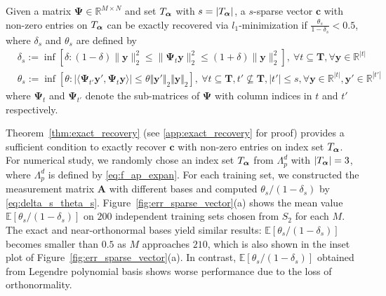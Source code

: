 \begin{thm}
  Given a matrix $\bm{{\Psi}} \in \mathbb{R}^{M\times N}$ and set $T_{\bm\alpha}$ with $s = \vert T_{\bm\alpha} \vert$, a $s$-sparse vector $\bm c$ with non-zero entries on $T_{\bm\alpha}$ can be exactly recovered via $l_1$-minimization if $\frac{\theta_s}{1-\delta_s} < 0.5$, where $\delta_s$ and $\theta_s$ are defined by
  \begin{equation}
    \begin{split}
      &\delta_s := \inf \left[ \delta :  (1-\delta)\|\bm y\|_2^2 \le \|\bm\Psi_t \bm y\|_2^2 \le (1+\delta)\|\bm y\|_2^2 \right] ,\  \forall t \subseteq \mathbf{T}, \forall \bm y \in \mathbb{R}^{|t|} \\
      &\theta_s := \inf \left[ \theta : \vert \langle \bm\Psi_{t'} {\bm y}', \bm\Psi_t \bm y\rangle \vert \le \theta \Vert {\bm y}'\Vert_2 \Vert \bm y\Vert_2 \right] ,\  \forall t \subseteq \mathbf{T}, t'\nsubseteq \mathbf{T}, |t'| \le s, \forall \bm y \in \mathbb{R}^{|t|}, {\bm y}' \in \mathbb{R}^{|t'|}
    \end{split}
    \label{eq:delta_s_theta_s}
  \end{equation} \label{thm:exact_recovery}
   where $\bm\Psi_{t}$ and $\bm\Psi_{t'}$ denote the sub-matrices of $\bm\Psi$ with column indices in $t$ and $t'$ respectively.
\end{thm}

Theorem~\ref{thm:exact_recovery} (see \ref{app:exact_recovery} for proof) provides a sufficient condition to exactly 
recover $\bm c$ with non-zero entries on index set $T_{\bm\alpha}$. For numerical study, we randomly chose an index set $T_{\bm\alpha}$  
from $\Lambda^d_{p}$ with $\vert T_{\bm\alpha}\vert = 3$, where $\Lambda_p^d$ is defined by \eqref{eq:f_ap_expan}.
For each training set, we constructed the measurement matrix $\bm A$ with different 
bases and computed $\theta_s/\left(1-\delta_s\right)$ by \eqref{eq:delta_s_theta_s}.
Figure~\ref{fig:err_sparse_vector}(a) shows the mean value $\mathbb{E}\left[\theta_s/\left(1-\delta_s\right)\right]$ on $200$ independent
training sets chosen from $S_2$ for each $M$. 
The exact and near-orthonormal bases yield similar results: $\mathbb{E}\left[\theta_s/\left(1-\delta_s\right)\right]$ becomes smaller than $0.5$ as $M$ approaches $210$,  which is also shown in the inset plot of Figure~\ref{fig:err_sparse_vector}(a).
In contrast, $\mathbb{E}\left[\theta_s/\left(1-\delta_s\right)\right]$ obtained from Legendre polynomial basis shows worse performance due to the loss of orthonormality.

